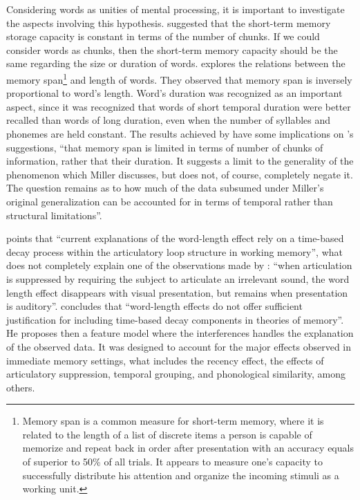 Considering words as unities of mental processing, it is important to investigate
the aspects involving this hypothesis. \cite{miller1956} suggested that the short-term memory
storage capacity is constant in terms of the number of chunks. If we could consider words as
chunks, then the short-term memory capacity should be the same regarding the size or duration
of words.
\cite{Baddeley1975} explores the relations between the memory span\footnote{Memory span is a common
measure for short-term memory, where it is related to the length of a list of discrete items a person 
is capable of memorize and repeat back in order after presentation with an accuracy equals of superior
to 50\% of all trials. It appears to measure one's capacity to successfully distribute his attention
and organize the incoming stimuli as a working unit.
} and length of words.
They observed that memory span is inversely proportional to word's length. Word's duration
was recognized as an important aspect, since it was recognized that words of short temporal duration were 
better recalled than words of long duration, even when the number of syllables and phonemes 
are held constant. 
The results achieved by \cite{Baddeley1975} have some implications on \cite{miller1956}'s 
suggestions, ``that memory span is limited in terms of number of chunks of information, rather that their
duration. It suggests a limit to the generality of the phenomenon which Miller discusses,
but does not, of course, completely negate it. The question remains as to how much
of the data subsumed under Miller's original generalization can be accounted for in terms
of temporal rather than structural limitations''\citep{Baddeley1975}.

\cite{neath1995} points that ``current explanations of the word-length effect
rely on a time-based decay process within the articulatory loop structure in working memory'',
what does not completely explain one of the observations made by \citep{Baddeley1975}: ``when
articulation is suppressed by requiring the subject to articulate an irrelevant sound, the
word length effect disappears with visual presentation, but remains when presentation is
auditory''. \cite{neath1995} concludes that ``word-length effects do not offer sufficient
justification for including time-based decay components in theories of memory''. He proposes
then a feature model \citep{nairne1988, nairne1990} where the interferences handles 
the explanation of the observed data.
It was designed to account for the major effects observed in immediate memory settings,
what includes the recency effect, the effects of articulatory suppression, temporal grouping, and
phonological similarity, among others. 

